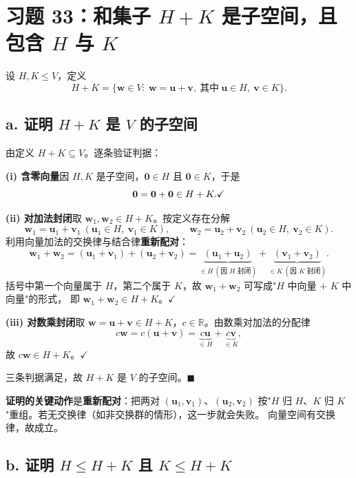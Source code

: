 \documentclass[11pt]{ctexart}
\newcommand{\0}{\mathbf{0}}
\begin{document}
\section*{习题 33：和集子 $H+K$ 是子空间，且包含 $H$ 与 $K$}

\noindent 设 $H,K\le V$，定义
\[
H+K=\{\mathbf w\in V:\ \mathbf w=\mathbf u+\mathbf v,\ \text{其中}\ \mathbf u\in H,\ \mathbf v\in K\}.
\]

\subsection*{a. 证明 $H+K$ 是 $V$ 的子空间}

由定义 $H+K\subseteq V$。逐条验证判据：

\textbf{(i) 含零向量}\quad 因 $H,K$ 是子空间，$\0\in H$ 且 $\0\in K$，于是
\[
\0=\0+\0\in H+K . \hfill \checkmark
\]

\textbf{(ii) 对加法封闭}\quad 取 $\mathbf w_1,\mathbf w_2\in H+K$。按定义存在分解
\[
\mathbf w_1=\mathbf u_1+\mathbf v_1\ (\mathbf u_1\in H,\ \mathbf v_1\in K),\qquad
\mathbf w_2=\mathbf u_2+\mathbf v_2\ (\mathbf u_2\in H,\ \mathbf v_2\in K).
\]
利用向量加法的交换律与结合律\textbf{重新配对}：
\[
\mathbf w_1+\mathbf w_2
=(\mathbf u_1+\mathbf v_1)+(\mathbf u_2+\mathbf v_2)
=\underbrace{(\mathbf u_1+\mathbf u_2)}_{\in H\ (\text{因 }H\text{ 封闭})}
+\underbrace{(\mathbf v_1+\mathbf v_2)}_{\in K\ (\text{因 }K\text{ 封闭})}.
\]
括号中第一个向量属于 $H$，第二个属于 $K$，故 $\mathbf w_1+\mathbf w_2$ 可写成"$H$ 中向量 $+$ $K$ 中向量"的形式，
即 $\mathbf w_1+\mathbf w_2\in H+K$。\hfill $\checkmark$

\textbf{(iii) 对数乘封闭}\quad 取 $\mathbf w=\mathbf u+\mathbf v\in H+K$，$c\in\mathbb R$。由数乘对加法的分配律
\[
c\mathbf w=c(\mathbf u+\mathbf v)=\underbrace{c\mathbf u}_{\in H}+\underbrace{c\mathbf v}_{\in K},
\]
故 $c\mathbf w\in H+K$。\hfill $\checkmark$

三条判据满足，故 $H+K$ 是 $V$ 的子空间。\hfill$\blacksquare$

\begin{warnbox}
\textbf{证明的关键动作}\quad 是\textbf{重新配对}：把两对 $(\mathbf u_1,\mathbf v_1)$、$(\mathbf u_2,\mathbf v_2)$
按"$H$ 归 $H$、$K$ 归 $K$"重组。若无交换律（如非交换群的情形），这一步就会失败。
向量空间有交换律，故成立。
\end{warnbox}

\subsection*{b. 证明 $H\le H+K$ 且 $K\le H+K$}
\end{document}

